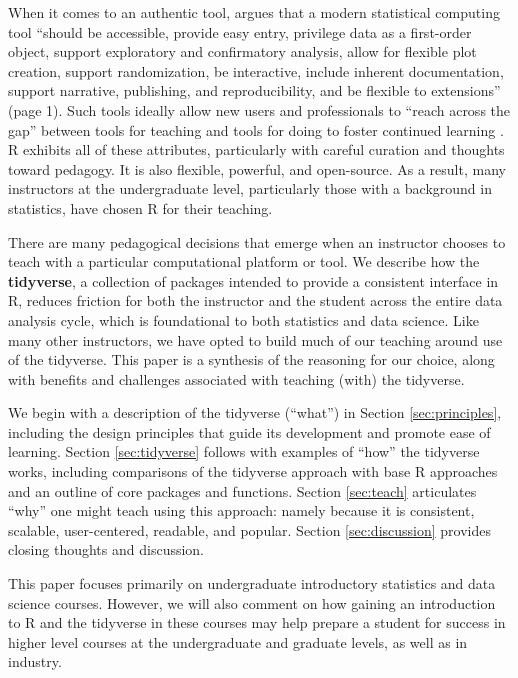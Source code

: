 \documentclass[12pt]{article}
\begin{document}
When it comes to an authentic tool, \citet{mcna_2019} argues that a
modern statistical computing tool ``should be accessible, provide easy
entry, privilege data as a first-order object, support exploratory and
confirmatory analysis, allow for flexible plot creation, support
randomization, be interactive, include inherent documentation, support
narrative, publishing, and reproducibility, and be flexible to
extensions'' (page 1). Such tools ideally allow new users and
professionals to ``reach across the gap'' between tools for teaching and
tools for doing to foster continued learning \citep{mcnamara2015}. R
exhibits all of these attributes, particularly with careful curation and
thoughts toward pedagogy. It is also flexible, powerful, and
open-source. As a result, many instructors at the undergraduate level,
particularly those with a background in statistics, have chosen R
\citep{Rlang} for their teaching.

There are many pedagogical decisions that emerge when an instructor
chooses to teach with a particular computational platform or tool. We
describe how the \textbf{tidyverse}, a collection of packages intended
to provide a consistent interface in R, reduces friction for both the
instructor and the student across the entire data analysis cycle, which
is foundational to both statistics and data science. Like many other
instructors, we have opted to build much of our teaching around use of
the tidyverse. This paper is a synthesis of the reasoning for our
choice, along with benefits and challenges associated with teaching
(with) the tidyverse.

We begin with a description of the tidyverse (``what'') in Section
\ref{sec:principles}, including the design principles that guide its
development and promote ease of learning. Section \ref{sec:tidyverse}
follows with examples of ``how'' the tidyverse works, including
comparisons of the tidyverse approach with base R approaches and an
outline of core packages and functions. Section \ref{sec:teach}
articulates ``why'' one might teach using this approach: namely because
it is consistent, scalable, user-centered, readable, and popular.
Section \ref{sec:discussion} provides closing thoughts and discussion.

This paper focuses primarily on undergraduate introductory statistics
and data science courses. However, we will also comment on how gaining
an introduction to R and the tidyverse in these courses may help prepare
a student for success in higher level courses at the undergraduate and
graduate levels, as well as in industry.
\end{document}
